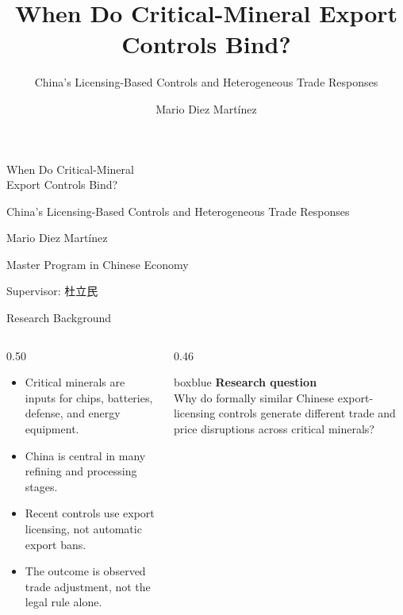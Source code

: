 \documentclass[aspectratio=169,11pt]{beamer}
\title{When Do Critical-Mineral Export Controls Bind?}
\subtitle{China's Licensing-Based Controls and Heterogeneous Trade Responses}
\author{Mario Diez Mart\'inez}
\institute{Master Program in Chinese Economy\\Supervisor: 杜立民}
\date{}
\newcommand{\tightitem}{\setlength\itemsep{0.25em}}
\newcommand{\plainbox}[2]{%
  \begin{beamercolorbox}[rounded=true,sep=0.48em,wd=\textwidth]{#1}
    #2
  \end{beamercolorbox}
}
\begin{document}
\begin{frame}[plain]
  \vspace{0.60cm}
  {
  When Do Critical-Mineral\\Export Controls Bind?\par}
  \vspace{0.28cm}
  {\large China's Licensing-Based Controls and Heterogeneous Trade Responses\par}
  \vfill
  {\large Mario Diez Mart\'inez\par}
  \vspace{0.16cm}
  {Master Program in Chinese Economy\par}
  {Supervisor: 杜立民\par}
\end{frame}

\begin{frame}{Research Background}
  \begin{columns}[T,totalwidth=\textwidth]
    \begin{column}{0.50\textwidth}
      \normalsize
      \begin{itemize}
        \tightitem
        \item Critical minerals are inputs for chips, batteries, defense, and energy equipment.
        \item China is central in many refining and processing stages.
        \item Recent controls use export licensing, not automatic export bans.
        \item The outcome is observed trade adjustment, not the legal rule alone.
      \end{itemize}
    \end{column}
    \begin{column}{0.46\textwidth}
      \plainbox{boxblue}{%
        \textbf{Research question}\\[0.12cm]
        Why do formally similar Chinese export-licensing controls generate different trade and price disruptions across critical minerals?
      }
    \end{column}
  \end{columns}
\end{frame}
\end{document}
